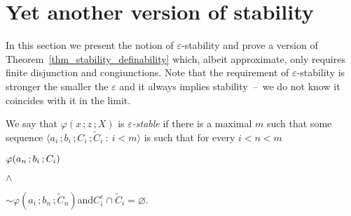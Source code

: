 \section{Yet another version of stability}
\def\medrel#1{\parbox{5ex}{\hfil $#1$}}
\def\ceq#1#2#3{\parbox[t]{28ex}{$\displaystyle #1$}\medrel{#2}{$\displaystyle #3$}}

In this section we present the notion of $\varepsilon$-stability and prove a version of Theorem~\ref{thm_stability_definability} which, albeit approximate,  only requires finite disjunction and congiunctions.
Note that the requirement of $\varepsilon$-stability is stronger the smaller the $\varepsilon$ and it always implies stability~--~we do not know it coincides with it in the limit.

\begin{definition}\label{def_epsilon_stable}\strut
  We say that $\varphi(x\,;z\,;X)$ is \emph{$\varepsilon$-stable\/} if there is a maximal $m$ such that some sequence $\langle a_i\,;b_i\,;C_i\,;\tilde C_i\ :\ i<m\rangle$ is such that for every $i<n<m$

    \ceq{\hfill \varphi(a_n\,;b_i\,;C_i)}{\wedge}{{\sim}\varphi(a_i\,;b_n\,;\tilde C_n)}\quad and\quad $C_i^\varepsilon\cap\tilde C_i=\varnothing$.\smallskip
\end{definition}




    

